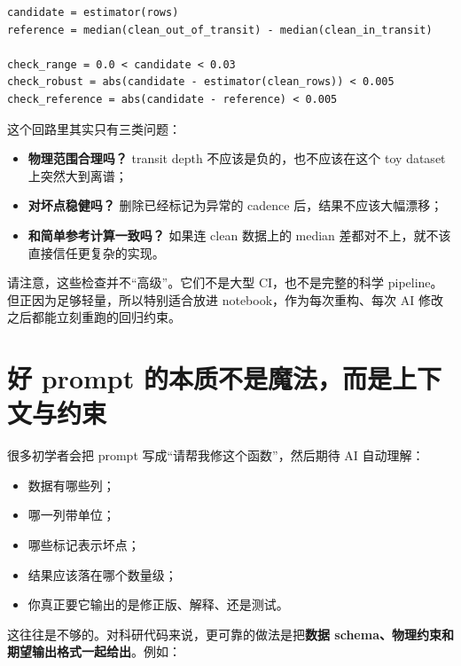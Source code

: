 \begin{examplebox}[最小验证回路]
\begin{lstlisting}[style=pythonstyle]
candidate = estimator(rows)
reference = median(clean_out_of_transit) - median(clean_in_transit)

check_range = 0.0 < candidate < 0.03
check_robust = abs(candidate - estimator(clean_rows)) < 0.005
check_reference = abs(candidate - reference) < 0.005
\end{lstlisting}
\end{examplebox}

这个回路里其实只有三类问题：

\begin{itemize}
    \item \textbf{物理范围合理吗？} transit depth 不应该是负的，也不应该在这个 toy dataset 上突然大到离谱；
    \item \textbf{对坏点稳健吗？} 删除已经标记为异常的 cadence 后，结果不应该大幅漂移；
    \item \textbf{和简单参考计算一致吗？} 如果连 clean 数据上的 median 差都对不上，就不该直接信任更复杂的实现。
\end{itemize}

请注意，这些检查并不“高级”。它们不是大型 CI，也不是完整的科学 pipeline。但正因为足够轻量，所以特别适合放进 notebook，作为每次重构、每次 AI 修改之后都能立刻重跑的回归约束。

\section{好 prompt 的本质不是魔法，而是上下文与约束}

很多初学者会把 prompt 写成“请帮我修这个函数”，然后期待 AI 自动理解：

\begin{itemize}
    \item 数据有哪些列；
    \item 哪一列带单位；
    \item 哪些标记表示坏点；
    \item 结果应该落在哪个数量级；
    \item 你真正要它输出的是修正版、解释、还是测试。
\end{itemize}

这往往是不够的。对科研代码来说，更可靠的做法是把\textbf{数据 schema、物理约束和期望输出格式一起给出}。例如：

